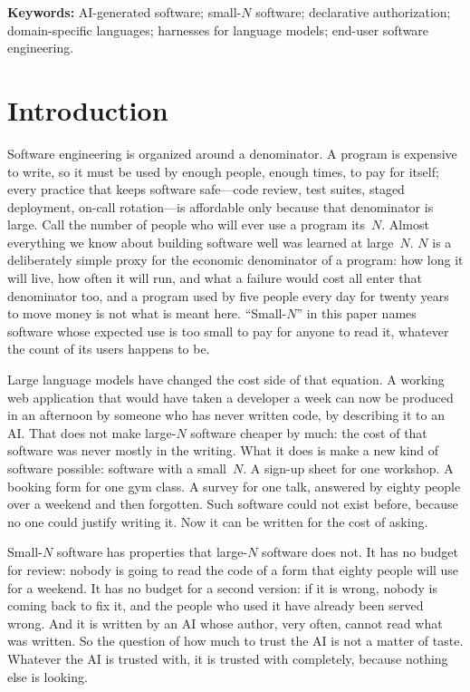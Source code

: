 \documentclass[11pt]{article}
\begin{document}
\noindent\textbf{Keywords:} AI-generated software; small-$N$ software; declarative authorization; domain-specific languages; harnesses for language models; end-user software engineering.

\section{Introduction}
\label{sec:intro}

Software engineering is organized around a denominator. A program is expensive to write, so it must be used by enough people, enough times, to pay for itself; every practice that keeps software safe---code review, test suites, staged deployment, on-call rotation---is affordable only because that denominator is large. Call the number of people who will ever use a program its~$N$. Almost everything we know about building software well was learned at large~$N$. $N$ is a deliberately simple proxy for the economic denominator of a program: how long it will live, how often it will run, and what a failure would cost all enter that denominator too, and a program used by five people every day for twenty years to move money is not what is meant here. ``Small-$N$'' in this paper names software whose expected use is too small to pay for anyone to read it, whatever the count of its users happens to be.

Large language models have changed the cost side of that equation. A working web application that would have taken a developer a week can now be produced in an afternoon by someone who has never written code, by describing it to an AI. That does not make large-$N$ software cheaper by much: the cost of that software was never mostly in the writing. What it does is make a new kind of software possible: software with a small~$N$. A sign-up sheet for one workshop. A booking form for one gym class. A survey for one talk, answered by eighty people over a weekend and then forgotten. Such software could not exist before, because no one could justify writing it. Now it can be written for the cost of asking.

Small-$N$ software has properties that large-$N$ software does not. It has no budget for review: nobody is going to read the code of a form that eighty people will use for a weekend. It has no budget for a second version: if it is wrong, nobody is coming back to fix it, and the people who used it have already been served wrong. And it is written by an AI whose author, very often, cannot read what was written. So the question of how much to trust the AI is not a matter of taste. Whatever the AI is trusted with, it is trusted with completely, because nothing else is looking.
\end{document}
